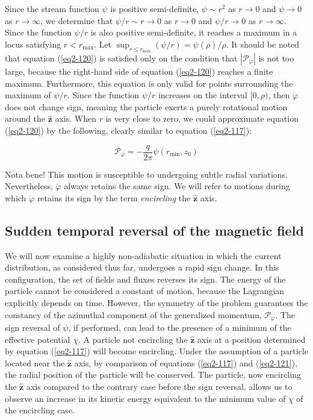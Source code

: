 \begin{enumerate}
    Since the stream function $\psi$ is positive semi-definite, $\psi\sim r^2$ as $r\to0$ and $\psi\to0$ as $r\to\infty$, we determine that $\psi/r\sim r\to0$ as $r\to0$ and $\psi/r\to0$ as $r\to\infty$. Since the function $\psi/r$ is also positive semi-definite, it reaches a maximum in a locus satisfying $r<r_\text{max}$. Let $\sup_{r\leq r_\text{max}}(\psi/r)=\psi(\rho)/\rho$. It should be noted that equation (\ref{eq2-120}) is satisfied only on the condition that $|\mathcal{P}_\varphi|$ is not too large, because the right-hand side of equation (\ref{eq2-120}) reaches a finite maximum. Furthermore, this equation is only valid for points surrounding the maximum of $\psi/r$. Since the function $\psi/r$ increases on the interval $[0,\rho)$, then $\dot{\varphi}$ does not change sign, meaning the particle exerts a purely rotational motion around the $\mathbf{\hat{z}}$ axis. When $r$ is very close to zero, we could approximate equation (\ref{eq2-120}) by the following, clearly similar to equation (\ref{eq2-117}):

    \begin{equation}
        \label{eq2-121}
        \mathcal{P}_\varphi=-\frac{q}{2\pi}\psi(r_\text{min},z_0)
    \end{equation}
    
    Nota bene! This motion is susceptible to undergoing subtle radial variations. Nevertheless, $\dot{\varphi}$ always retains the same sign. We will refer to motions during which $\dot{\varphi}$ retains its sign by the term \textit{encircling} the $\mathbf{\hat{z}}$ axis.
\end{enumerate}

\subsection{Sudden temporal reversal of the magnetic field}

We will now examine a highly non-adiabatic situation in which the current distribution, as considered thus far, undergoes a rapid sign change. In this configuration, the set of fields and fluxes reverses its sign. The energy of the particle cannot be considered a constant of motion, because the Lagrangian explicitly depends on time. However, the symmetry of the problem guarantees the constancy of the azimuthal component of the generalized momentum, $\mathcal{P}_\varphi$. The sign reversal of $\psi$, if performed, can lead to the presence of a minimum of the effective potential $\chi$. A particle not encircling the $\mathbf{\hat{z}}$ axis at a position determined by equation (\ref{eq2-117}) will become encircling. Under the assumption of a particle located near the $\mathbf{\hat{z}}$ axis, by comparison of equations (\ref{eq2-117}) and (\ref{eq2-121}), the radial position of the particle will be conserved. The particle, now encircling the $\mathbf{\hat{z}}$ axis compared to the contrary case before the sign reversal, allows us to observe an increase in its kinetic energy equivalent to the minimum value of $\chi$ of the encircling case.

